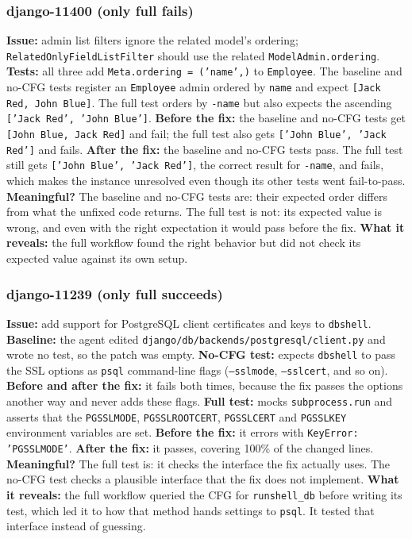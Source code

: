 \documentclass[conference]{IEEEtran}
\begin{document}
\subsubsection{django-11400 (only full fails)}
\textbf{Issue:} admin list filters ignore the related model's ordering; \texttt{RelatedOnlyFieldListFilter} should use the related \texttt{ModelAdmin.ordering}. \textbf{Tests:} all three add \texttt{Meta.ordering = ('name',)} to \texttt{Employee}. The baseline and no-CFG tests register an \texttt{Employee} admin ordered by \texttt{name} and expect \texttt{[Jack Red, John Blue]}. The full test orders by \texttt{-name} but also expects the ascending \texttt{['Jack Red', 'John Blue']}. \textbf{Before the fix:} the baseline and no-CFG tests get \texttt{[John Blue, Jack Red]} and fail; the full test also gets \texttt{['John Blue', 'Jack Red']} and fails. \textbf{After the fix:} the baseline and no-CFG tests pass. The full test still gets \texttt{['John Blue', 'Jack Red']}, the correct result for \texttt{-name}, and fails, which makes the instance unresolved even though its other tests went fail-to-pass. \textbf{Meaningful?} The baseline and no-CFG tests are: their expected order differs from what the unfixed code returns. The full test is not: its expected value is wrong, and even with the right expectation it would pass before the fix. \textbf{What it reveals:} the full workflow found the right behavior but did not check its expected value against its own setup.

\subsubsection{django-11239 (only full succeeds)}
\textbf{Issue:} add support for PostgreSQL client certificates and keys to \texttt{dbshell}. \textbf{Baseline:} the agent edited \texttt{django/db/backends/postgresql/client.py} and wrote no test, so the patch was empty. \textbf{No-CFG test:} expects \texttt{dbshell} to pass the SSL options as \texttt{psql} command-line flags (\texttt{--sslmode}, \texttt{--sslcert}, and so on). \textbf{Before and after the fix:} it fails both times, because the fix passes the options another way and never adds these flags. \textbf{Full test:} mocks \texttt{subprocess.run} and asserts that the \texttt{PGSSLMODE}, \texttt{PGSSLROOTCERT}, \texttt{PGSSLCERT} and \texttt{PGSSLKEY} environment variables are set. \textbf{Before the fix:} it errors with \texttt{KeyError: 'PGSSLMODE'}. \textbf{After the fix:} it passes, covering 100\% of the changed lines. \textbf{Meaningful?} The full test is: it checks the interface the fix actually uses. The no-CFG test checks a plausible interface that the fix does not implement. \textbf{What it reveals:} the full workflow queried the CFG for \texttt{runshell\_db} before writing its test, which led it to how that method hands settings to \texttt{psql}. It tested that interface instead of guessing.
\end{document}
